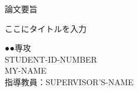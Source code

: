 \documentclass[a4paper,uplatex,13pt,dvipdfmx]{jsarticle}
\begin{document}
\begin{center}
\begin{huge}
論文要旨\\
\end{huge}
\vspace{2cm}
\begin{LARGE}
ここにタイトルを入力
\end{LARGE}
\end{center}
\vspace{2cm}
\begin{flushright}
\begin{large}
●●専攻\\
STUDENT-ID-NUMBER\\
MY-NAME\\
指導教員：SUPERVISOR'S-NAME
\end{large}
\end{flushright}\
\vspace{2cm}


\end{document}
